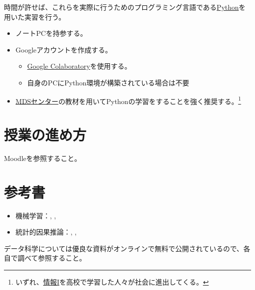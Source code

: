 \documentclass[
  xelatex,
  ja=standard]{bxjsarticle}
\providecommand{\tightlist}{%
  \setlength{\itemsep}{0pt}\setlength{\parskip}{0pt}}\usepackage{longtable,booktabs,array}
\begin{document}
時間が許せば、これらを実際に行うためのプログラミング言語である\href{https://www.python.org/}{Python}を用いた実習を行う。

\begin{itemize}
\tightlist
\item
  ノートPCを持参する。
\item
  Googleアカウントを作成する。

  \begin{itemize}
  \tightlist
  \item
    \href{https://colab.research.google.com/?hl=ja}{Google
    Colaboratory}を使用する。
  \item
    自身のPCにPython環境が構築されている場合は不要
  \end{itemize}
\item
  \href{https://www.mdsc.hokudai.ac.jp/mds/learning-management-system/}{MDSセンター}の教材を用いてPythonの学習をすることを強く推奨する。\footnote{いずれ、\href{https://www.mext.go.jp/a_menu/shotou/zyouhou/detail/1416756.htm}{情報I}を高校で学習した人々が社会に進出してくる。}
\end{itemize}

\hypertarget{ux6388ux696dux306eux9032ux3081ux65b9}{%
\section{授業の進め方}\label{ux6388ux696dux306eux9032ux3081ux65b9}}

Moodleを参照すること。

\hypertarget{ux53c2ux8003ux66f8}{%
\section{参考書}\label{ux53c2ux8003ux66f8}}

\begin{itemize}
\tightlist
\item
  機械学習：\citet{ng2019}, \citet{hisano2018}, \citet{kitagawa2023}
\item
  統計的因果推論：\citet{nakamuro2017}, \citet{ito2017},
  \citet{matsubayashi2021}
\end{itemize}

データ科学については優良な資料がオンラインで無料で公開されているので、各自で調べて参照すること。


  
\end{document}

